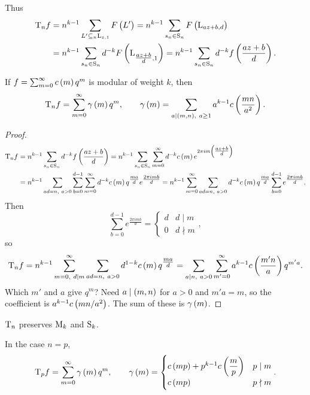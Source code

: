Thus
\begin{align*}
\T_nf
& = n^{k - 1}\sum_{L' \subseteq_n \L_{z, 1}} F\br{L'}
= n^{k - 1}\sum_{s_n \in \S_n} F\br{\L_{az + b, d}} \\
& = n^{k - 1}\sum_{s_n \in \S_n} d^{-k}F\br{\L_{\tfrac{az + b}{d}, 1}}
= n^{k - 1}\sum_{s_n \in \S_n} d^{-k}f\br{\dfrac{az + b}{d}}.
\end{align*}

\begin{theorem}
If $ f = \sum_{m = 0}^\infty c\br{m}q^m $ is modular of weight $ k $, then
$$ \T_nf = \sum_{m = 0}^\infty \gamma\br{m}q^m, \qquad \gamma\br{m} = \sum_{a \mid \br{m, n}, \ a \ge 1} a^{k - 1}c\br{\dfrac{mn}{a^2}}. $$
\end{theorem}

\begin{proof}
\begin{align*}
\T_nf
& = n^{k - 1}\sum_{s_n \in \S_n} d^{-k}f\br{\dfrac{az + b}{d}}
= n^{k - 1}\sum_{s_n \in \S_n} \sum_{m = 0}^\infty d^{-k}c\br{m}e^{2\pi im\br{\tfrac{az + b}{d}}} \\
& = n^{k - 1}\sum_{ad = n, \ a > 0} \sum_{b = 0}^{d - 1} \sum_{m = 0}^\infty d^{-k}c\br{m}q^{\tfrac{ma}{d}}e^{\tfrac{2\pi imb}{d}}
= n^{k - 1}\sum_{m = 0}^\infty \sum_{ad = n, \ a > 0} d^{-k}c\br{m}q^{\tfrac{ma}{d}}\sum_{b = 0}^{d - 1} e^{\tfrac{2\pi imb}{d}}.
\end{align*}
Then
$$ \sum_{b = 0}^{d - 1} e^{\tfrac{2\pi imb}{d}} =
\begin{cases}
d & d \mid m \\
0 & d \nmid m
\end{cases},
$$
so
$$ \T_nf = n^{k - 1}\sum_{m = 0, \ d \mid m}^\infty \sum_{ad = n, \ a > 0} d^{1 - k}c\br{m}q^{\tfrac{ma}{d}} = \sum_{a \mid n, \ a > 0} \sum_{m' = 0}^\infty a^{k - 1}c\br{\dfrac{m'n}{a}}q^{m'a}. $$
Which $ m' $ and $ a $ give $ q^m $? Need $ a \mid \br{m, n} $ for $ a > 0 $ and $ m'a = m $, so the coefficient is $ a^{k - 1}c\br{mn / a^2} $. The sum of these is $ \gamma\br{m} $.
\end{proof}

\begin{corollary}
$ \T_n $ preserves $ \M_k $ and $ \S_k $.
\end{corollary}

In the case $ n = p $,
$$ \T_pf = \sum_{m = 0}^\infty \gamma\br{m}q^m, \qquad \gamma\br{m} =
\begin{cases}
c\br{mp} + p^{k - 1}c\br{\dfrac{m}{p}} & p \mid m \\
c\br{mp} & p \nmid m
\end{cases}.
$$

